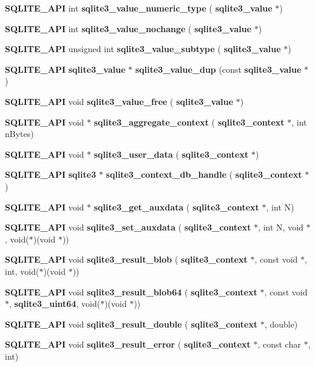 \begin{DoxyCompactItemize}
\item 
\textbf{ S\+Q\+L\+I\+T\+E\+\_\+\+A\+PI} int \textbf{ sqlite3\+\_\+value\+\_\+numeric\+\_\+type} (\textbf{ sqlite3\+\_\+value} $\ast$)
\item 
\textbf{ S\+Q\+L\+I\+T\+E\+\_\+\+A\+PI} int \textbf{ sqlite3\+\_\+value\+\_\+nochange} (\textbf{ sqlite3\+\_\+value} $\ast$)
\item 
\textbf{ S\+Q\+L\+I\+T\+E\+\_\+\+A\+PI} unsigned int \textbf{ sqlite3\+\_\+value\+\_\+subtype} (\textbf{ sqlite3\+\_\+value} $\ast$)
\item 
\textbf{ S\+Q\+L\+I\+T\+E\+\_\+\+A\+PI} \textbf{ sqlite3\+\_\+value} $\ast$ \textbf{ sqlite3\+\_\+value\+\_\+dup} (const \textbf{ sqlite3\+\_\+value} $\ast$)
\item 
\textbf{ S\+Q\+L\+I\+T\+E\+\_\+\+A\+PI} void \textbf{ sqlite3\+\_\+value\+\_\+free} (\textbf{ sqlite3\+\_\+value} $\ast$)
\item 
\textbf{ S\+Q\+L\+I\+T\+E\+\_\+\+A\+PI} void $\ast$ \textbf{ sqlite3\+\_\+aggregate\+\_\+context} (\textbf{ sqlite3\+\_\+context} $\ast$, int n\+Bytes)
\item 
\textbf{ S\+Q\+L\+I\+T\+E\+\_\+\+A\+PI} void $\ast$ \textbf{ sqlite3\+\_\+user\+\_\+data} (\textbf{ sqlite3\+\_\+context} $\ast$)
\item 
\textbf{ S\+Q\+L\+I\+T\+E\+\_\+\+A\+PI} \textbf{ sqlite3} $\ast$ \textbf{ sqlite3\+\_\+context\+\_\+db\+\_\+handle} (\textbf{ sqlite3\+\_\+context} $\ast$)
\item 
\textbf{ S\+Q\+L\+I\+T\+E\+\_\+\+A\+PI} void $\ast$ \textbf{ sqlite3\+\_\+get\+\_\+auxdata} (\textbf{ sqlite3\+\_\+context} $\ast$, int N)
\item 
\textbf{ S\+Q\+L\+I\+T\+E\+\_\+\+A\+PI} void \textbf{ sqlite3\+\_\+set\+\_\+auxdata} (\textbf{ sqlite3\+\_\+context} $\ast$, int N, void $\ast$, void($\ast$)(void $\ast$))
\item 
\textbf{ S\+Q\+L\+I\+T\+E\+\_\+\+A\+PI} void \textbf{ sqlite3\+\_\+result\+\_\+blob} (\textbf{ sqlite3\+\_\+context} $\ast$, const void $\ast$, int, void($\ast$)(void $\ast$))
\item 
\textbf{ S\+Q\+L\+I\+T\+E\+\_\+\+A\+PI} void \textbf{ sqlite3\+\_\+result\+\_\+blob64} (\textbf{ sqlite3\+\_\+context} $\ast$, const void $\ast$, \textbf{ sqlite3\+\_\+uint64}, void($\ast$)(void $\ast$))
\item 
\textbf{ S\+Q\+L\+I\+T\+E\+\_\+\+A\+PI} void \textbf{ sqlite3\+\_\+result\+\_\+double} (\textbf{ sqlite3\+\_\+context} $\ast$, double)
\item 
\textbf{ S\+Q\+L\+I\+T\+E\+\_\+\+A\+PI} void \textbf{ sqlite3\+\_\+result\+\_\+error} (\textbf{ sqlite3\+\_\+context} $\ast$, const char $\ast$, int)

\end{DoxyCompactItemize}

